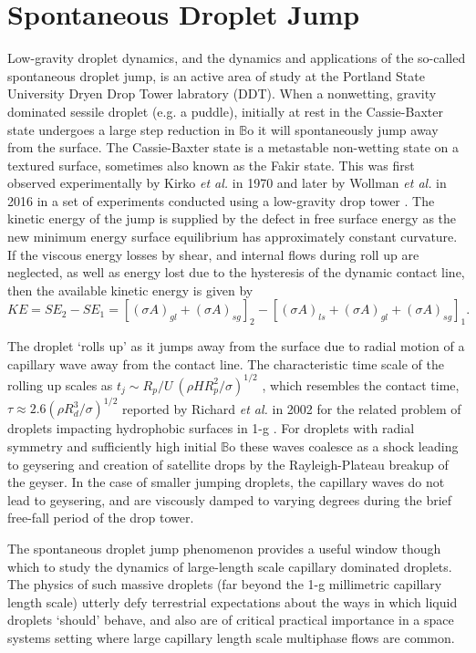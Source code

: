 \documentclass[12pt,a4paper,oneside]{book}
\begin{document}
\section{Spontaneous Droplet Jump}
Low-gravity droplet dynamics, and the dynamics and applications of the so-called spontaneous droplet jump, is an active area of study at the Portland State University Dryen Drop Tower labratory (DDT). When a nonwetting, gravity dominated sessile droplet (e.g. a puddle), initially at rest in the Cassie-Baxter state undergoes a large step reduction in $\mathbb{B}\mbox{o}$ it will spontaneously jump away from the surface. The Cassie-Baxter state is a metastable non-wetting state on a textured surface, sometimes also known as the Fakir state. This was first observed experimentally by Kirko \emph{et al.} \cite{kirko_phenomenon_1970} in 1970 and later by Wollman \emph{et al.} in 2016 in a set of experiments conducted using a low-gravity drop tower \cite{wollman_more_2016}. The kinetic energy of the jump is supplied by the defect in free surface energy as the new minimum energy surface equilibrium has approximately constant curvature. If the viscous energy losses by shear, and internal flows during roll up are neglected, as well as energy lost due to the hysteresis of the dynamic contact line, then the available kinetic energy is given by
\[KE = SE_2 -SE_1 = [(\sigma A)_{gl} + (\sigma A)_{sg}]_2 - [(\sigma A)_{ls} + (\sigma A)_{gl} + (\sigma A)_{sg}]_1. \]

The droplet `rolls up' as it jumps away from the surface due to radial motion of a capillary wave away from the contact line. The characteristic time scale of the rolling up scales as $t_j \sim R_p/U ~(\rho H R^2_p/\sigma)^{1/2}$ \cite{attari_puddle_2016}, which resembles the contact time, $\tau \approx 2.6(\rho R^3_d/\sigma)^{1/2}$ reported by Richard \emph{et al.} in 2002 for the related problem of droplets impacting hydrophobic surfaces in 1-g \cite{richard_surface_2002}. For droplets with radial symmetry and sufficiently high initial $\mathbb{B}\mbox{o}$ these waves coalesce as a shock leading to geysering and creation of satellite drops by the Rayleigh-Plateau breakup of the geyser. In the case of smaller jumping droplets, the capillary waves do not lead to geysering, and are viscously damped to varying degrees during the brief free-fall period of the drop tower.

The spontaneous droplet jump phenomenon provides a useful window though which to study the dynamics of large-length scale capillary dominated droplets. The physics of such massive droplets (far beyond the 1-g millimetric capillary length scale) utterly defy terrestrial expectations about the ways in which liquid droplets `should' behave, and also are of critical practical importance in a space systems setting where large capillary length scale multiphase flows are common.
\end{document}

